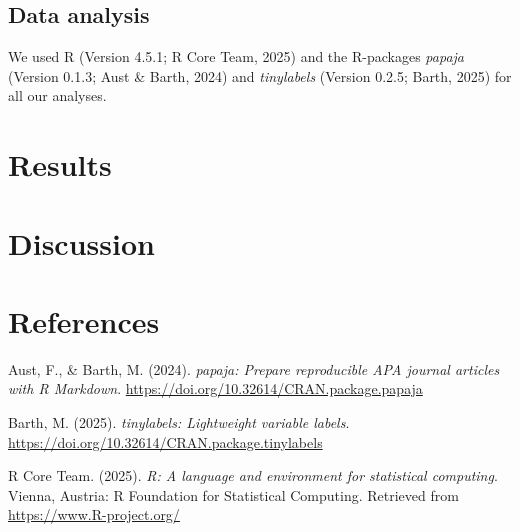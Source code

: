\documentclass[
  man]{apa6}
\newlength{\cslhangindent}
\newenvironment{CSLReferences}[2] %
 {\begin{list}{}{%
  \setlength{\itemindent}{0pt}
  \setlength{\leftmargin}{0pt}
  \setlength{\parsep}{0pt}
  \ifodd #1
   \setlength{\leftmargin}{\cslhangindent}
   \setlength{\itemindent}{-1\cslhangindent}
  \fi
  \setlength{\itemsep}{#2\baselineskip}}}
 {\end{list}}
\begin{document}
\subsection{Data analysis}\label{data-analysis}

We used R (Version 4.5.1; R Core Team, 2025) and the R-packages \emph{papaja} (Version 0.1.3; Aust \& Barth, 2024) and \emph{tinylabels} (Version 0.2.5; Barth, 2025) for all our analyses.

\section{Results}\label{results}

\section{Discussion}\label{discussion}

\newpage

\section{References}\label{references}

\label{refs}
\begin{CSLReferences}{1}{0}
Aust, F., \& Barth, M. (2024). \emph{{papaja}: {Prepare} reproducible {APA} journal articles with {R Markdown}}. \url{https://doi.org/10.32614/CRAN.package.papaja}

Barth, M. (2025). \emph{{tinylabels}: Lightweight variable labels}. \url{https://doi.org/10.32614/CRAN.package.tinylabels}

R Core Team. (2025). \emph{R: A language and environment for statistical computing}. Vienna, Austria: R Foundation for Statistical Computing. Retrieved from \url{https://www.R-project.org/}

\end{CSLReferences}
\end{document}
